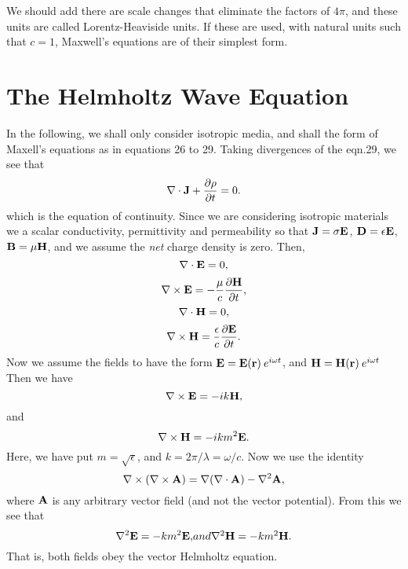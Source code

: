 \documentclass[12pt]{article}
\begin{document}
We should add there are scale changes that eliminate the factors of $4 \pi$, and these units are called
Lorentz-Heaviside units. If these are used, with natural units such that $c=1$, Maxwell's equations are of their simplest 
form.

\section{The Helmholtz Wave Equation}

In the following, we shall only consider isotropic media, and shall the form
of Maxell's equations as in equations 26 to 29.
Taking divergences of the eqn.29, we see that
\begin{equation}
\nabla \cdot {\bf J}+\frac{\partial \rho}{\partial t}=0.
\end{equation}
which is the equation of continuity. Since we are considering isotropic materials
we a scalar conductivity, permittivity and permeability so that 
${\bf J}=\sigma {\bf E}$,
${\bf D}=\epsilon  {\bf E}$,
${\bf B}=\mu {\bf H}$, and we assume the {\it net} charge density is zero.
Then,
\begin{equation}
 \nabla \cdot {\bf E}= 0, 
\end{equation}
\begin{equation}
\nabla \times {\bf E}=- \frac{\mu}{c} \frac{\partial {\bf H}}{\partial t},
\end{equation}
\begin{equation}
 \nabla \cdot {\bf H}=0,
\end{equation}
\begin{equation}
\nabla \times {\bf H}= 
\frac{\epsilon}{c} \frac{\partial {\bf E}}{\partial t}.
\end{equation}
Now we assume the fields to have the form 
${\bf E}={\bf E}({\bf r}) \> e^{i \omega t}$, and
${\bf H}={\bf H}({\bf r}) \> e^{i \omega t}$
Then we have
\begin{equation}
\nabla \times {\bf E}=- i k {\bf H},
\end{equation}
and
\begin{equation}
\nabla \times {\bf H}=- i k m^2 {\bf E}.
\end{equation}
Here, we have put $m=\sqrt{\epsilon}$, and $k=2 \pi / \lambda=\omega/c$.
Now we use the identity
\begin{equation}
\nabla \times (\nabla \times {\bf A})=\nabla (\nabla \cdot {\bf A} )
 -\nabla^2 {\bf A},
\end{equation}
where ${\bf A}$ is any arbitrary vector field (and not the vector potential).
From this we see that
\begin{equation}
\nabla^2 {\bf E}= -km^2 {\bf E}, 
$$   and $$
\nabla^2 {\bf H}= -km^2 {\bf H}. 
\end{equation}
That is, both fields obey the vector Helmholtz equation.
\end{document}
